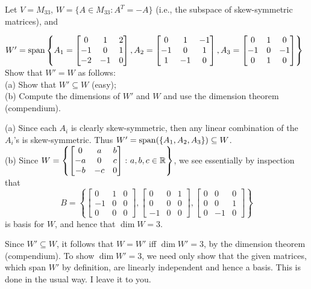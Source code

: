 \ii Let $V=M_{33}$, $W=\{A\in M_{33}\colon A^T=-A\}$ (i.e., the subspace of skew-symmetric matrices), and 

$W'=\operatorname{span}\left\{A_1=\begin{bmatrix}
0&1&2\\
-1&0&1\\
-2&-1&0
\end{bmatrix}, 
A_2=\begin{bmatrix}
0&1&-1\\
-1&0&1\\
1&-1&0
\end{bmatrix},
A_3=\begin{bmatrix}
0&1&0\\
-1&0&-1\\
0&1&0
\end{bmatrix}
\right\}
$
Show that $W'=W$ as follows:
\\
(a) Show that $W'\subseteq W$ (easy); 
\\
\noindent (b) Compute the dimensions of $W'$ and $W$ and use the dimension theorem (compendium). 

\begin{solution}
\noindent 
(a) Since each $A_i$ is clearly skew-symmetric, then any linear combination of the $A_i$'s is skew-symmetric. Thus $W'=\operatorname{span}(\{A_1,A_2,A_3\})\subseteq W$. 
\\
(b)
Since $W=\left\{\begin{bmatrix}
0&a&b\\
-a&0&c\\
-b&-c&0
\end{bmatrix}\colon a,b,c\in {\mathbb R}\right\}$, we see essentially by inspection that 
\[
B=\left\{
\begin{bmatrix}
0&1&0\\
-1&0&0\\
0&0&0
\end{bmatrix},
\begin{bmatrix}
0&0&1\\
0&0&0\\
-1&0&0
\end{bmatrix},
\begin{bmatrix}
0&0&0\\
0&0&1\\
0&-1&0
\end{bmatrix}
\right\}
\]
is  basis for $W$, and hence that $\dim W=3$. 

Since $W'\subseteq W$, it follows that $W=W'$ iff $\dim W'=3$, by the dimension theorem (compendium). To show $\dim W'=3$, we need only show that the given matrices, which span $W'$ by definition, are linearly independent and hence a basis. This is done in the usual way. I leave it to you. 
\end{solution}


